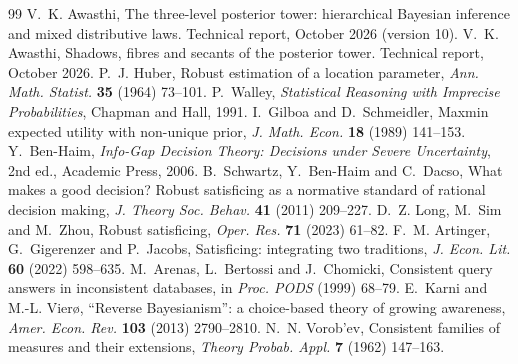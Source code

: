 \documentclass[11pt]{article}
\theoremstyle{definition}\newtheorem{definition}[theorem]{Definition}\newtheorem{remark}[theorem]{Remark}\newtheorem{example}[theorem]{Example}
\begin{document}
\begin{thebibliography}{99}
 V.~K. Awasthi, The three-level posterior tower: hierarchical Bayesian inference and mixed distributive laws. Technical report, October 2026 (version 10).
 V.~K. Awasthi, Shadows, fibres and secants of the posterior tower. Technical report, October 2026.
 P.~J. Huber, Robust estimation of a location parameter, \emph{Ann. Math. Statist.} \textbf{35} (1964) 73--101.
 P.~Walley, \emph{Statistical Reasoning with Imprecise Probabilities}, Chapman and Hall, 1991.
 I.~Gilboa and D.~Schmeidler, Maxmin expected utility with non-unique prior, \emph{J. Math. Econ.} \textbf{18} (1989) 141--153.
 Y.~Ben-Haim, \emph{Info-Gap Decision Theory: Decisions under Severe Uncertainty}, 2nd ed., Academic Press, 2006.
 B.~Schwartz, Y.~Ben-Haim and C.~Dacso, What makes a good decision? Robust satisficing as a normative standard of rational decision making, \emph{J. Theory Soc. Behav.} \textbf{41} (2011) 209--227.
 D.~Z. Long, M.~Sim and M.~Zhou, Robust satisficing, \emph{Oper. Res.} \textbf{71} (2023) 61--82.
 F.~M. Artinger, G.~Gigerenzer and P.~Jacobs, Satisficing: integrating two traditions, \emph{J. Econ. Lit.} \textbf{60} (2022) 598--635.
 M.~Arenas, L.~Bertossi and J.~Chomicki, Consistent query answers in inconsistent databases, in \emph{Proc. PODS} (1999) 68--79.
 E.~Karni and M.-L. Vier{\o}, ``Reverse Bayesianism'': a choice-based theory of growing awareness, \emph{Amer. Econ. Rev.} \textbf{103} (2013) 2790--2810.
 N.~N. Vorob'ev, Consistent families of measures and their extensions, \emph{Theory Probab. Appl.} \textbf{7} (1962) 147--163.
\end{thebibliography}
\end{document}
